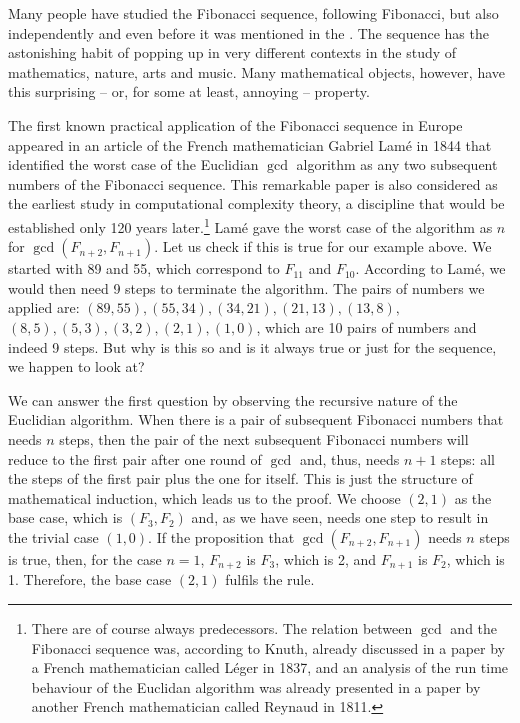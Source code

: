 \documentclass{scrreprt}
\begin{document}
Many people have studied the Fibonacci sequence,
following Fibonacci,
but also independently 
and even before it was mentioned in the .
The sequence has the astonishing habit
of popping up in very different contexts
in the study of mathematics, nature, arts and music.
Many mathematical objects, however, have
this surprising -- or, for some at least, annoying --
property.

The first known practical application of the Fibonacci sequence
in Europe appeared in an article of the French mathematician
Gabriel Lamé in 1844 that identified the worst case
of the Euclidian $\gcd$ algorithm as any two subsequent numbers
of the Fibonacci sequence.
This remarkable paper is also considered as the earliest
study in computational complexity theory,
a discipline that would be established only 120 years later.\footnote{
There are of course always predecessors.
The relation between $\gcd$ and the Fibonacci sequence
was, according to Knuth, already discussed in a paper 
by a French mathematician called Léger in 1837,
and an analysis of the run time behaviour 
of the Euclidan algorithm
was already presented in a paper by another French mathematician
called Reynaud in 1811.}
Lamé gave the worst case of the algorithm as $n$
for $\gcd(F_{n+2}, F_{n+1})$.
Let us check if this is true for our example above.
We started with 89 and 55, which correspond
to $F_{11}$ and $F_{10}$.
According to Lamé, we would then need 9 steps
to terminate the algorithm.
The pairs of numbers we applied are:
$(89,55),(55,34),(34,21),(21,13),(13,8),$
$(8,5),(5,3),(3,2),(2,1),(1,0)$,
which are 10 pairs of numbers and indeed 9 steps.
But why is this so and is it always true
or just for the sequence, we happen to look at?

We can answer the first question by observing
the recursive nature of the Euclidian algorithm.
When there is a pair of subsequent Fibonacci numbers
that needs $n$ steps, then the pair of the next
subsequent Fibonacci numbers 
will reduce to the first pair after one round of $\gcd$
and, thus, needs $n + 1$ steps:
all the steps of the first pair plus the one for itself. 
This is just the structure of mathematical induction,
which leads us to the proof.
We choose $(2,1)$ as the base case,
which is $(F_3,F_2)$ and,
as we have seen,
needs one step to result 
in the trivial case $(1,0)$.
If the proposition that $\gcd(F_{n+2}, F_{n+1})$ 
needs $n$ steps is true, then,
for the case $n = 1$,
$F_{n+2}$ is $F_3$, which is 2,
and $F_{n+1}$ is $F_2$, which is 1.
Therefore, the base case $(2,1)$ fulfils the rule.
\end{document}
